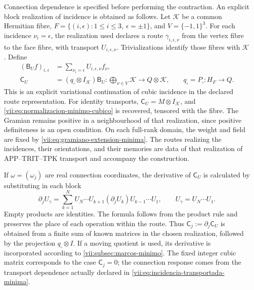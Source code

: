 Connection dependence is specified before performing the
contraction. An explicit block realization of incidence
is obtained as follows. Let \(\mathcal K\) be a common Hermitian fibre,
\(F=\{(i,\epsilon):1\leq i\leq3,\ \epsilon=\pm1\}\), and
\(V=\{-1,1\}^3\). For each incidence \(\nu_i=\epsilon\),
the realization used declares a route \(\gamma_{i,\epsilon,\nu}\)
from the vertex fibre to the face fibre, with transport
\(U_{i,\epsilon,\nu}\). Trivializations identify those fibres
with \(\mathcal K\). Define
\begin{equation}
 \begin{split}
 (\mathsf B_Uf)_{i,\epsilon}
   &=\sum_{\nu_i=\epsilon}U_{i,\epsilon,\nu}f_\nu,\\
 \mathsf C_U&=(q_\square\otimes I_{\mathcal K})\mathsf B_U:
   \bigoplus_{\nu\in V}\mathcal K\longrightarrow Q\otimes\mathcal K,
 \qquad q_\square=P_\square:H_F\to Q.
 \end{split}
 \label{vii:eq:incidencia-transportada-minima}
\end{equation}
This is an explicit variational continuation of cubic incidence
in the declared route representation. For identity transports,
\(\mathsf C_U=M\otimes I_{\mathcal K}\), and
\eqref{vii:eq:normalizacion-minimo-cubico} is recovered, tensored with the fibre.
The Gramian remains positive in a neighbourhood of that realization,
since positive definiteness is an open condition. On each full-rank
domain, the weight and field are fixed by
\eqref{vii:eq:gramiano-extension-minima}. The routes realizing
the incidences, their orientations, and their memories are data of that
realization of APP--TRIT--TPK transport and accompany the construction.

If \(\omega=(\omega_j)\) are real connection coordinates,
the derivative of \(\mathsf C_U\) is calculated by substituting in each block
\begin{equation}
 \partial_j U_\gamma
 =\sum_{k=1}^{N}
    U_N\cdots U_{k+1}(\partial_jU_k)U_{k-1}\cdots U_1,
 \qquad U_\gamma=U_N\cdots U_1.
 \label{vii:eq:derivada-incidencia-rutas}
\end{equation}
Empty products are identities. The formula follows from the product
rule and preserves the place of each operation within the route.
Thus \(\mathsf C_j:=\partial_j\mathsf C_U\) is obtained from a
finite sum of known matrices in the chosen realization, followed
by the projection \(q_\square\otimes I\). If a moving quotient
is used, its derivative is incorporated according to
\ref{vii:subsec:marcos-minimo}. The fixed integer cubic matrix corresponds
to the case \(\mathsf C_j=0\); the connection response comes from the
transport dependence actually declared in
\eqref{vii:eq:incidencia-transportada-minima}.

